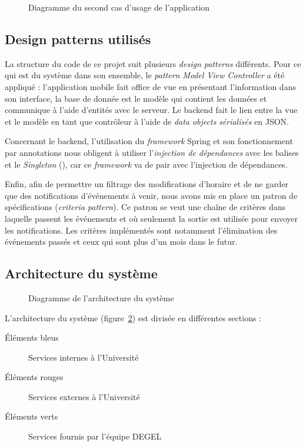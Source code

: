     \begin{figure}[p] \centering
        
        \caption{Diagramme du second cas d'usage de l'application}
        \label{fig.casUsage2}
    \end{figure}

    \subsection{Design patterns utilisés}
    La structure du code de ce projet suit plusieurs \emph{design patterns} différents. Pour ce qui est du système dans son ensemble, le \emph{pattern} \emph{Model View Controller} a été appliqué : l'application mobile fait office de vue en présentant l'information dans son interface, la base de donnée est le modèle qui contient les données et communique à l'aide d'entités avec le serveur. Le backend fait le lien entre la vue et le modèle en tant que contrôleur à l'aide de \emph{data objects} \emph{sérialisés} en JSON.

    Concernant le backend, l'utilisation du \emph{framework} Spring et son fonctionnement par annotations nous obligent à utiliser l'\emph{injection de dépendances} avec les balises  et le \emph{Singleton} (), car ce \emph{framework} va de pair avec l'injection de dépendances.

    Enfin, afin de permettre un filtrage des modifications d'horaire et de ne garder que des notifications d'événements à venir, nous avons mis en place un patron de spécifications (\emph{criteria pattern}). Ce patron se veut une chaîne de critères dans laquelle passent les événements et où seulement la sortie est utilisée pour envoyer les notifications. Les critères implémentés sont notamment l'élimination des événements passés et ceux qui sont plus d'un mois dans le futur.

    \subsection{Architecture du système}
    \begin{figure}[p] \centering
        
        \caption{Diagramme de l'architecture du système}
        \label{fig.architectureSysteme}
    \end{figure}
    
    \noindent L'architecture du système (figure~\ref{fig.architectureSysteme}) est divisée en différentes sections :
    \begin{description}
        \item[Éléments bleus] Services internes à l'Université
        \item[Éléments rouges] Services externes à l'Université
        \item[Éléments verts] Services fournis par l'équipe DEGEL
    \end{description}

